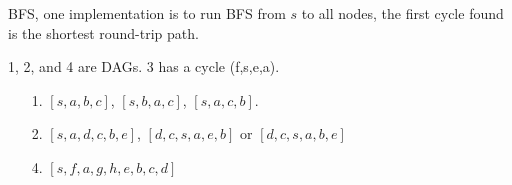 \vspace{.5em}
\begin{Answer} BFS, one implementation is to run BFS from $s$ to all nodes, the first cycle found is the shortest round-trip path.
\end{Answer}

\vspace{.5em}
\begin{Answer} 1, 2, and 4 are DAGs. 3 has a cycle (f,s,e,a).
\end{Answer}

\vspace{.5em}
\begin{Answer} 
    \begin{itemize}
        \item[1.] $[s,a,b,c]$, $[s,b,a,c]$, $[s,a,c,b]$. 
        \item[2.] $[s,a,d,c,b,e]$, $[d,c,s,a,e,b]$ or $[d,c,s,a,b,e]$
        \item[4.] $[s,f,a,g,h,e,b,c,d]$ 
    \end{itemize}
\end{Answer}

